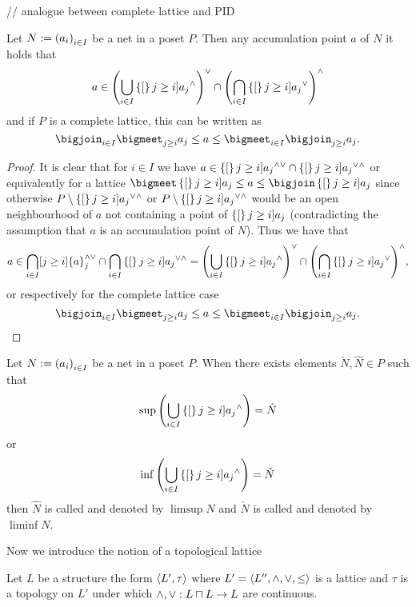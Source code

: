 \documentclass[8pt,a4paper]{article}
\begin{document}
// analogue between complete lattice and PID

\begin{lemma}
    Let $N:=\net[i\in I]{a_i}$ be a net in a poset $P$. Then any accumulation point $a$ of $N$ it holds that
    $$
    a\in {\left(\Setjoin_{i\in I}{\set[j \geq i]{a_j}^{\meet}}\right)}^{\join}\setmeet{\left(\Setmeet_{i\in I}\set[j \geq i]{a_j}^{\join}\right)}^{\meet}
    $$
    and if $P$ is a complete lattice, this can be written as
    $$
    \bigjoin_{i\in I}\bigmeet_{j\geq i}{a_j}\leq a\leq \bigmeet_{i\in I}\bigjoin_{j\geq i}{a_j}.
    $$
\end{lemma}%

\begin{proof}
    It is clear that for $i\in I$ we have $a\in\set[j \geq i]{a_j}^{\meet\join}\setmeet\set[j \geq i]{a_j}^{\join\meet}$ or equivalently for a lattice $\bigmeet\set[j \geq i]{a_j}\leq a\leq \bigjoin\set[j \geq i]{a_j}$ since otherwise
    $P\setminus\set[j \geq i]{a_j}^{\join\meet}$ or $P\setminus\set[j \geq i]{a_j}^{\join\meet}$ would be an open neighbourhood of $a$ not containing a point of $\set[j\geq i]{a_j}$ (contradicting the assumption that $a$ is an accumulation point of $N$).
    Thus we have that
    $$
    a\in \Setmeet_{i\in I}[j \geq i]{\set{a_j}^{\meet\join}}\setmeet\Setmeet_{i\in I}\set[j \geq i]{a_j}^{\join\meet}=
    {\left(\Setjoin_{i\in I}{\set[j \geq i]{a_j}^{\meet}}\right)}^{\join}\setmeet{\left(\Setmeet_{i\in I}\set[j \geq i]{a_j}^{\join}\right)}^{\meet},
    $$
    or respectively for the complete lattice case
    $$
    \bigjoin_{i\in I}\bigmeet_{j\geq i}{a_j}\leq a\leq \bigmeet_{i\in I}\bigjoin_{j\geq i}{a_j}.
    $$
\end{proof}

\begin{definition}
    Let $N:=\net[i\in I]{a_i}$ be a net in a poset $P$. When there exists elements $\check{N},\hat{N}\in P$ such that
    $$
    \sup{\left(\Setjoin_{i\in I}{\set[j \geq i]{a_j}^{\meet}}\right)}=\hat{N}
    $$
    or
    $$
    \inf{\left(\Setjoin_{i\in I}{\set[j \geq i]{a_j}^{\meet}}\right)}=\check{N}
    $$
    then $\hat{N}$ is called  and denoted by $\limsup{N}$ and $\check{N}$ is called  and denoted by $\liminf{N}$.
\end{definition}

Now we introduce the notion of a topological lattice

\begin{definition}
    Let $L$ be a structure the form $\struct{L',\tau}$ where $L'=\struct{L'',\meet,\join,\leq}$ is a lattice and $\tau$ is a topology on $L'$ under which $\wedge, \vee:L\mathbin{\sqcap} L \rightarrow L$ are continuous.
\end{definition}
\end{document}
